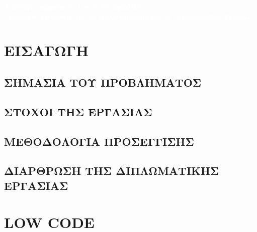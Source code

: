 \documentclass[12pt]{report}
\begin{document}
    \begin{titlepage}
        \centering

        \vspace*{10em}


        \begin{headerdark}
            \begin{Din Medium}
                \centering
                \LARGE \textcolor{white}{Ανάπτυξη εφαρμογής σε Low Code περιβάλλον:\\
                Σχεδιασμός Εφαρμογής για τον Προγραμματισμό και την Παρακολούθηση Εργασιών}
            \end{Din Medium}
        \end{headerdark}

    \end{titlepage}


    \tableofcontents
    \pagebreak


    \chapter{ΕΙΣΑΓΩΓΗ}

    \section{ΣΗΜΑΣΙΑ ΤΟΥ ΠΡΟΒΛΗΜΑΤΟΣ}
    \section{ΣΤΟΧΟΙ ΤΗΣ ΕΡΓΑΣΙΑΣ}
    \section{ΜΕΘΟΔΟΛΟΓΙΑ ΠΡΟΣΕΓΓΙΣΗΣ}
    \section{ΔΙΑΡΘΡΩΣΗ ΤΗΣ ΔΙΠΛΩΜΑΤΙΚΗΣ ΕΡΓΑΣΙΑΣ}

    \chapter{LOW CODE}
\end{document}
